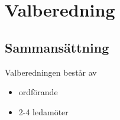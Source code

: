 \section{Valberedning}
 
\subsection{Sammansättning}
Valberedningen består av
\begin{itemize}
	\item ordförande
	\item 2-4 ledamöter
\end{itemize}
